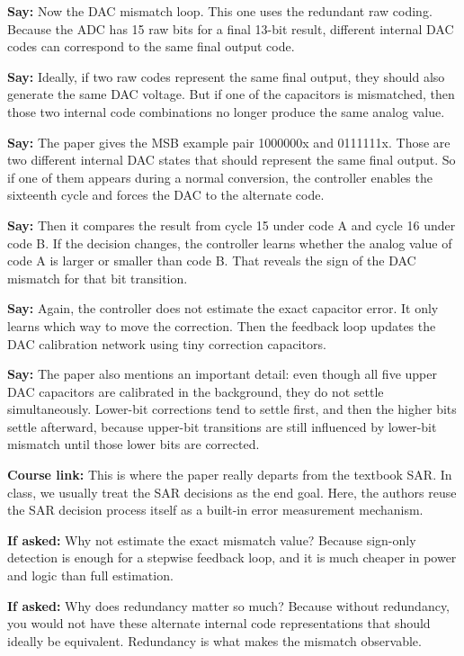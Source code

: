 \documentclass[11pt]{article}
\newcommand{\speak}[1]{\textbf{Say:} #1}
\newcommand{\ifasked}[1]{\textbf{If asked:} #1}
\newcommand{\course}[1]{\textbf{Course link:} #1}
\begin{document}
\speak{Now the DAC mismatch loop. This one uses the redundant raw coding. Because the ADC has 15 raw bits for a final 13-bit result, different internal DAC codes can correspond to the same final output code.}

\speak{Ideally, if two raw codes represent the same final output, they should also generate the same DAC voltage. But if one of the capacitors is mismatched, then those two internal code combinations no longer produce the same analog value.}

\speak{The paper gives the MSB example pair 1000000x and 0111111x. Those are two different internal DAC states that should represent the same final output. So if one of them appears during a normal conversion, the controller enables the sixteenth cycle and forces the DAC to the alternate code.}

\speak{Then it compares the result from cycle 15 under code A and cycle 16 under code B. If the decision changes, the controller learns whether the analog value of code A is larger or smaller than code B. That reveals the sign of the DAC mismatch for that bit transition.}

\speak{Again, the controller does not estimate the exact capacitor error. It only learns which way to move the correction. Then the feedback loop updates the DAC calibration network using tiny correction capacitors.}

\speak{The paper also mentions an important detail: even though all five upper DAC capacitors are calibrated in the background, they do not settle simultaneously. Lower-bit corrections tend to settle first, and then the higher bits settle afterward, because upper-bit transitions are still influenced by lower-bit mismatch until those lower bits are corrected.}

\course{This is where the paper really departs from the textbook SAR. In class, we usually treat the SAR decisions as the end goal. Here, the authors reuse the SAR decision process itself as a built-in error measurement mechanism.}

\ifasked{Why not estimate the exact mismatch value? Because sign-only detection is enough for a stepwise feedback loop, and it is much cheaper in power and logic than full estimation.}

\ifasked{Why does redundancy matter so much? Because without redundancy, you would not have these alternate internal code representations that should ideally be equivalent. Redundancy is what makes the mismatch observable.}
\end{document}

